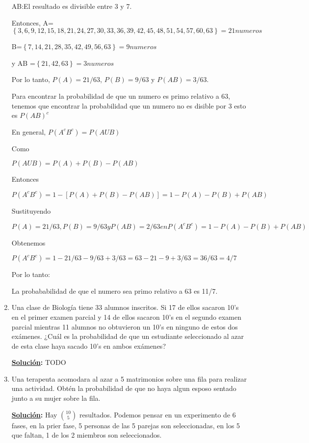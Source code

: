 \documentclass[11pt,letterpaper]{report}
\newcommand{\sol}{\textbf{\underline{Solución}: }} %
\begin{document}
\begin{enumerate}
AB:El resultado es divisible entre 3 y 7.

Entonces,
A=$\left\lbrace 3,6,9,12,15,18,21,24,27,30,33,36,39,42,45,48,51,54,57,60,63\right\rbrace = 21 numeros$

B=$\left\lbrace 7, 14, 21, 28, 35, 42, 49, 56, 63 \right\rbrace = 9 numeros $

y AB =$\left\lbrace 21, 42, 63 \right\rbrace = 3 numeros $

Por lo tanto, $P(A) = 21/63$, $P(B) = 9/63$ y $P(AB) = 3/63$.

Para encontrar la probabilidad de que un numero es primo relativo a 63, tenemos que encontrar la probabilidad que un numero no es disible por 3 esto es $P(AB)^c$

En general,
$P(A^cB^c) = P(AUB)$

Como

$P(AUB)=P(A)+P(B)-P(AB)$

Entonces

$P(A^cB^c)=1-[P(A)+P(B)-P(AB)]
          =1-P(A)-P(B)+P(AB)$

Sustituyendo

$P(A)=21/63 , P(B)=9/63 y P(AB)=2/63 en P(A^cB^c)= 1 -P(A)-P(B)+P(AB)$

Obtenemos

$P(A^cB^c) = 1-21/63-9/63+3/63 = 63-21-9+3/63 = 36/63 = 4/7 $

Por lo tanto:

La probababilidad de que el numero sea primo relativo a 63 es 11/7.          


\item Una clase de Biología tiene 33 alumnos inscritos. Si 17 de ellos sacaron 10's en el primer
examen parcial y 14 de ellos sacaron 10's en el segundo examen parcial mientras 11 alumnos no
obtuvieron un 10's en ninguno de estos dos exámenes. ¿Cuál es la probabilidad de que un estudiante
seleccionado al azar de esta clase haya sacado 10's en ambos exámenes?

\sol TODO

\item Una terapeuta acomodara al azar a 5 matrimonios sobre una fila para realizar una actividad.
Obtén la probabilidad de que no haya algun esposo sentado junto a su mujer sobre la fila.

\sol Hay $\binom{10}{5}$ resultados. Podemos pensar en un experimento de 6 fases, en la prier fase, 5 personas de las 5 parejas son seleccionadas, en los 5 que faltan, 1 de los 2 miembros son seleccionados.


\end{enumerate}
\end{document}
